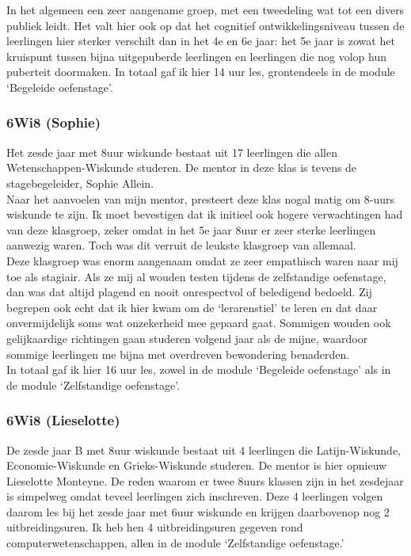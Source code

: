 \documentclass[a4paper,11pt]{article}
\theoremstyle{definition}
\begin{document}
\noindent In het algemeen een zeer aangename groep, met een tweedeling wat tot een divers 
publiek leidt. Het valt hier ook op dat het cognitief ontwikkelingsniveau tussen 
de leerlingen hier sterker verschilt dan in het 4e en 6e jaar: het 5e jaar is 
zowat het kruispunt tussen bijna uitgepuberde leerlingen en leerlingen die nog 
volop hun puberteit doormaken. In totaal gaf ik hier 14 uur les, grontendeels in de module `Begeleide oefenstage'.

\subsubsection{6Wi8 (Sophie)}\label{6Wi8a}
Het zesde jaar met 8uur wiskunde bestaat uit 17 leerlingen die allen 
Wetenschappen-Wiskunde studeren. De mentor in deze klas is tevens de stagebegeleider, Sophie Allein.\\

\noindent Naar het aanvoelen van mijn mentor, presteert deze klas nogal
matig om 8-uurs wiskunde te zijn. Ik moet bevestigen dat ik initieel ook hogere 
verwachtingen had van deze klasgroep, zeker omdat in het 5e jaar 8uur er zeer 
sterke leerlingen aanwezig waren. Toch was dit verruit de leukste klasgroep van 
allemaal.\\

\noindent Deze klasgroep was enorm aangenaam omdat ze zeer empathisch waren naar mij toe 
als stagiair. Als ze mij al wouden testen tijdens de zelfstandige oefenstage, dan was dat altijd plagend en nooit 
onrespectvol of beledigend bedoeld. Zij begrepen ook echt dat ik hier kwam om de `lerarenstiel' te leren 
en dat daar onvermijdelijk soms wat onzekerheid mee gepaard gaat. Sommigen 
wouden ook gelijkaardige richtingen gaan studeren volgend jaar als de mijne, 
waardoor sommige leerlingen me bijna met overdreven bewondering benaderden.\\

\noindent In totaal gaf ik hier 16 uur les, zowel in de module `Begeleide oefenstage' als 
in de module `Zelfstandige oefenstage'.

\subsubsection{6Wi8 (Lieselotte)}\label{6Wi8b}
De zesde jaar B met 8uur wiskunde bestaat uit 4 leerlingen die Latijn-Wiskunde, 
Economie-Wiskunde en Grieks-Wiskunde studeren. De mentor is hier opnieuw Lieselotte Monteyne. 
De reden waarom er twee 8uurs 
klassen zijn in het zesdejaar is simpelweg omdat teveel leerlingen zich 
inschreven. Deze 4 leerlingen volgen daarom les bij het zesde jaar met 6uur 
wiskunde en krijgen daarbovenop nog 2 uitbreidingsuren. Ik heb hen 4 
uitbreidingsuren gegeven rond computerwetenschappen, allen in de module 
`Zelfstandige oefenstage.'\\
\end{document}
